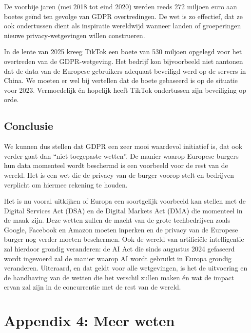 \documentclass[
  10pt,
  dutch,
  paper=a4,
  ,captions=tableheading
]{scrbook}
\begin{document}
\begin{noteblock}
De voorbije jaren (mei 2018 tot eind 2020) werden reeds 272 miljoen euro
aan boetes geïnd ten gevolge van GDPR overtredingen. De wet is zo
effectief, dat ze ook ondertussen dient als inspiratie wereldwijd
wanneer landen of groeperingen nieuwe privacy-wetgevingen willen
construeren.
\end{noteblock}

\begin{tipblock}
In de lente van 2025 kreeg TikTok een boete van 530 miljoen opgelegd
voor het overtreden van de GDPR-wetgeving. Het bedrijf kon bijvoorbeeld
niet aantonen dat de data van de Europese gebruikers adequaat beveiligd
werd op de servers in China. We moeten er wel bij vertellen dat de boete
gebaseerd is op de situatie voor 2023. Vermoedelijk én hopelijk heeft
TikTok ondertussen zijn beveiliging op orde.
\end{tipblock}

\section{Conclusie}\label{conclusie}

We kunnen dus stellen dat GDPR een zeer mooi waardevol initiatief is,
dat ook verder gaat dan ``niet toegepaste wetten''. De manier waarop
Europese burgers hun data momenteel wordt beschermd is een voorbeeld
voor de rest van de wereld. Het is een wet die de privacy van de burger
voorop stelt en bedrijven verplicht om hiermee rekening te houden.

Het is nu vooral uitkijken of Europa een soortgelijk voorbeeld kan
stellen met de Digital Services Act (DSA) en de Digital Markets Act
(DMA) die momenteel in de maak zijn. Deze wetten zullen de macht van de
grote techbedrijven zoals Google, Facebook en Amazon moeten inperken en
de privacy van de Europese burger nog verder moeten beschermen. Ook de
wereld van artificiële intelligentie zal hierdoor grondig veranderen: de
AI Act die sinds augustus 2024 gefaseerd wordt ingevoerd zal de manier
waarop AI wordt gebruikt in Europa grondig veranderen. Uiteraard, en dat
geldt voor alle wetgevingen, is het de uitvoering en de handhaving van
de wetten die het verschil zullen maken én wat de impact ervan zal zijn
in de concurrentie met de rest van de wereld.

\chapter{Appendix 4: Meer weten}\label{appendix-4-meer-weten}
\end{document}
